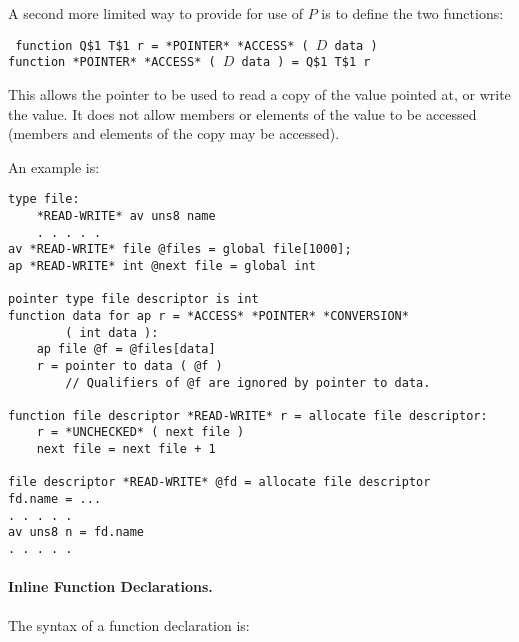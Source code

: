 \documentclass[12pt]{article}
\newcommand{\subsubsubsection}[1]{\paragraph[#1]{#1.}}
\newenvironment{indpar}[1][0.3in]%
	{\begin{list}{}%
		     {\setlength{\itemsep}{0in}%
		      \setlength{\topsep}{0in}%
		      \setlength{\parsep}{1ex}%
		      \setlength{\labelwidth}{#1}%
		      \setlength{\leftmargin}{#1}%
		      \addtolength{\leftmargin}{\labelsep}}%
	 \item}%
	{\end{list}}
\begin{document}
A second more limited way to provide for use of $P$ is to define
the two functions:
\begin{indpar} \tt
function Q\$1 T\$1 r = *POINTER* *ACCESS* ( $D$ data ) \\
function *POINTER* *ACCESS* ( $D$ data ) = Q\$1 T\$1 r
\end{indpar}

This allows the pointer to be used to read a copy of the
value pointed at, or write the value.  It does not allow
members or elements of the value to be accessed
(members and elements of the copy may be accessed).

An example is:

\begin{indpar}\begin{verbatim}
type file:
    *READ-WRITE* av uns8 name
    . . . . .
av *READ-WRITE* file @files = global file[1000];
ap *READ-WRITE* int @next file = global int

pointer type file descriptor is int
function data for ap r = *ACCESS* *POINTER* *CONVERSION*
        ( int data ):
    ap file @f = @files[data]
    r = pointer to data ( @f )
        // Qualifiers of @f are ignored by pointer to data.

function file descriptor *READ-WRITE* r = allocate file descriptor:
    r = *UNCHECKED* ( next file )
    next file = next file + 1

file descriptor *READ-WRITE* @fd = allocate file descriptor
fd.name = ...
. . . . .
av uns8 n = fd.name
. . . . .
\end{verbatim}\end{indpar}




\subsubsubsection{Inline Function Declarations}
\label{INLINE-FUNCTION-DECLARATIONS}

The syntax of a function declaration is:
\end{document}
